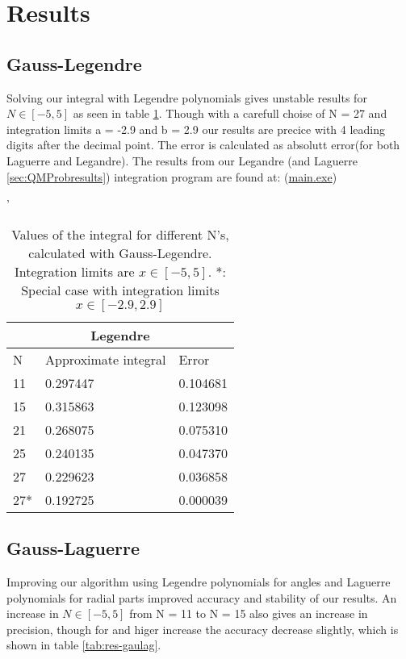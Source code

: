 \documentclass[../main.tex]{subfiles}
\begin{document}
\section{Results} \label{sec:results}
\subsection{Gauss-Legendre} \label{sec:QMGausslegresults}

Solving our integral with Legendre polynomials gives unstable results for $N \in [-5,5]$ as seen in table \ref{tab:res-gauleg}. Though with a carefull choise of N = 27 and integration limits a = -2.9 and b = 2.9 our results are precice with 4 leading digits after the decimal point. The error is calculated as absolutt error(for both Laguerre and Legandre).
The results from our Legandre (and Laguerre \ref{sec:QMProbresults}) integration program are found at: (\href{https://github.com/kmaasrud/Project-3/tree/master/code/Gauss-Quadrature}{main.exe})

\begin{table}[h!]'

\begin{center}
  \begin{tabular}{ |p{1cm}|p{4cm}|p{3cm}|}
 \hline
 \multicolumn{3}{|c|}{\textbf{Legendre}} \\
 \hline
       N   &Approximate integral & Error\\
 \hline
 11 & 0.297447 & 0.104681\\
 15 & 0.315863 & 0.123098\\
 21 & 0.268075 & 0.075310\\
 25 & 0.240135 & 0.047370\\
 27 & 0.229623 & 0.036858\\
 27*& 0.192725 & 0.000039\\
 \hline
 \end{tabular}
 \caption{Values of the integral for different N's, calculated with Gauss-Legendre. Integration limits are $x\in[-5,5]$. *: Special case with integration limits $x\in[-2.9,2.9]$}
 \label{tab:res-gauleg}
 \end{center}
\end{table}


\subsection{Gauss-Laguerre} \label{sec:QMQMGausslagresults}
Improving our algorithm using Legendre polynomials for angles and Laguerre polynomials for radial parts improved accuracy and stability of our results. An increase in $N \in [-5,5]$ from N = 11 to N = 15 also gives an increase in precision, though for and higer increase the accuracy decrease slightly, which is shown in table \ref{tab:res-gaulag}.
\end{document}
